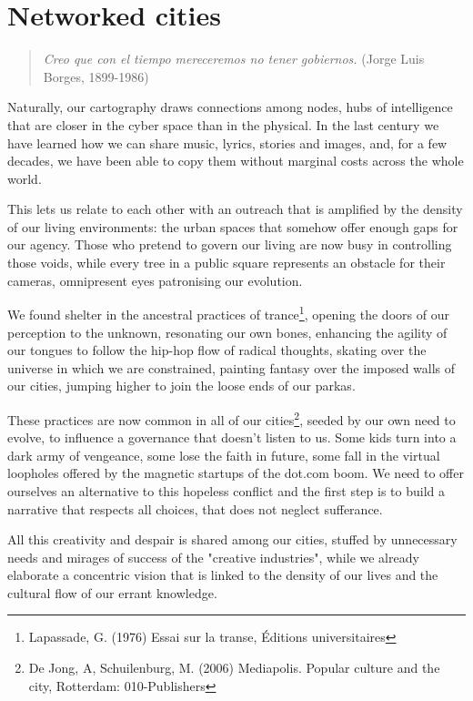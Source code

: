 \section{Networked cities}
\label{s:weaver_birds:networked_cities}

\begin{quote}
\textit{Creo que con el tiempo mereceremos no tener gobiernos.} (Jorge Luis
Borges, 1899-1986)
\end{quote}

Naturally, our cartography draws connections among nodes, hubs of intelligence
that are closer in the cyber space than in the physical. In the last century we
have learned how we can share music, lyrics, stories and images, and, for a few
decades, we have been able to copy them without marginal costs across the whole
world.

This lets us relate to each other with an outreach that is amplif\hbox{}ied by
the density of our living environments: the urban spaces that somehow
of\hbox{}fer enough gaps for our agency. Those who pretend to govern our living
are now busy in controlling those voids, while every tree in a public square
represents an obstacle for their cameras, omnipresent eyes patronising our
evolution.

We found shelter in the ancestral practices of trance\footnote{Lapassade, G.
(1976) Essai sur la transe, Éditions universitaires}, opening the doors of our
perception to the unknown, resonating our own bones, enhancing the agility of
our tongues to follow the hip-hop f\hbox{}low of radical thoughts, skating over
the universe in which we are constrained, painting fantasy over the imposed
walls of our cities, jumping higher to join the loose ends of our parkas.

These practices are now common in all of our cities\footnote{De Jong, A,
Schuilenburg, M. (2006) Mediapolis. Popular culture and the city, Rotterdam:
010-Publishers}, seeded by our own need to evolve, to inf\hbox{}luence a
governance that doesn't listen to us. Some kids turn into a dark army of
vengeance, some lose the faith in future, some fall in the virtual loopholes
of\hbox{}fered by the magnetic startups of the dot.com boom. We need to
of\hbox{}fer ourselves an alternative to this hopeless conf\hbox{}lict and the
f\hbox{}irst step is to build a narrative that respects all choices, that does
not neglect suf\hbox{}ferance.

All this creativity and despair is shared among our cities, stuf\hbox{}fed by
unnecessary needs and mirages of success of the "creative industries", while we
already elaborate a concentric vision that is linked to the density of our lives
and the cultural f\hbox{}low of our errant knowledge.

